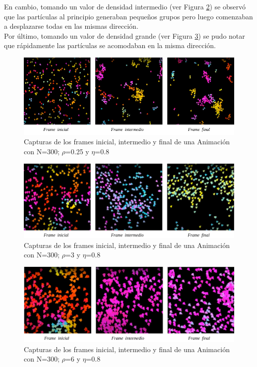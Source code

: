 \documentclass[12pt, a4paper]{report}
\begin{document}
En cambio, tomando un valor de densidad intermedio (ver Figura \ref{fig:density_N300_n08_d3}) se observó que las partículas al principio generaban pequeños grupos pero luego comenzaban a desplazarse todas en las mismas dirección.\\

Por último, tomando un valor de densidad grande (ver Figura \ref{fig:density_N300_n08_d6}) se pudo notar que rápidamente las partículas se acomodaban en la misma dirección. 

\begin{figure}[h]
\includegraphics[scale=0.54]{density_N300_n08_d025.png}
\centering 
\caption{Capturas de los frames inicial, intermedio y final de una Animación con N=300; $\rho$=0.25 y $\eta$=0.8}
\label{fig:density_N300_n08_d025}
\end{figure}

\begin{figure}[h]
\includegraphics[scale=0.4]{density_N300_n08_d3.png}
\centering 
\caption{Capturas de los frames inicial, intermedio y final de una Animación con N=300; $\rho$=3 y $\eta$=0.8}
\label{fig:density_N300_n08_d3}
\end{figure}

\pagebreak
\begin{figure}[h]
\includegraphics[scale=0.4]{density_N300_n08_d6.png}
\centering 
\caption{Capturas de los frames inicial, intermedio y final de una Animación con N=300; $\rho$=6 y $\eta$=0.8}
\label{fig:density_N300_n08_d6}
\end{figure}
\end{document}
